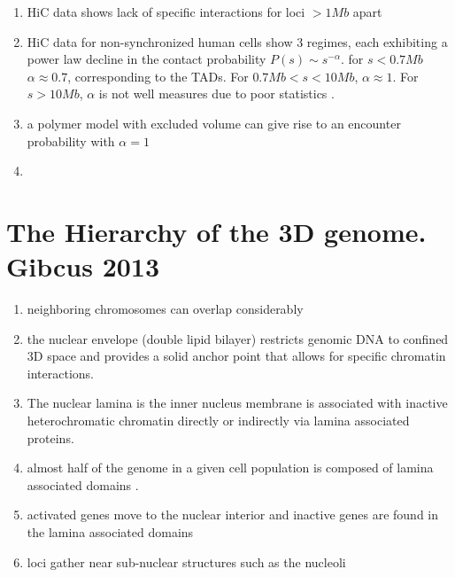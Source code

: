 \documentclass[12pt]{book}
\begin{document}
\begin{enumerate}
\item HiC data shows lack of specific interactions for loci $>1Mb$ apart
\item HiC data for non-synchronized human cells show 3 regimes, each exhibiting a power law decline in the contact probability $P(s)\sim s^{-\alpha}$. for $s<0.7Mb$ $\alpha\approx0.7$, corresponding to the TADs. For $0.7Mb<s<10Mb$, $\alpha\approx1$. For $s>10Mb$, $\alpha$ is not well measures due to poor statistics \cite{lieberman2009comprehensive}.
\item a polymer model with excluded volume can give rise to an encounter probability with $\alpha=1$
\item 
\end{enumerate}

\section{The Hierarchy of the 3D genome.  Gibcus 2013 \cite{gibcus2013hierarchy}}
\begin{enumerate}
\item neighboring chromosomes can overlap considerably 
\item the nuclear envelope (double lipid bilayer) restricts genomic DNA to confined 3D space and provides a solid anchor point that allows for specific chromatin interactions. 
\item The nuclear lamina is the inner nucleus membrane is associated with inactive heterochromatic chromatin directly or indirectly via lamina associated proteins.
\item almost half of the genome in a given cell population is composed of lamina associated domains \cite{guelen2008domain}. 
\item activated genes move to the nuclear interior and inactive genes are found in the lamina associated domains
\item loci gather near sub-nuclear structures such as the nucleoli 
\end{enumerate}



\end{document}
